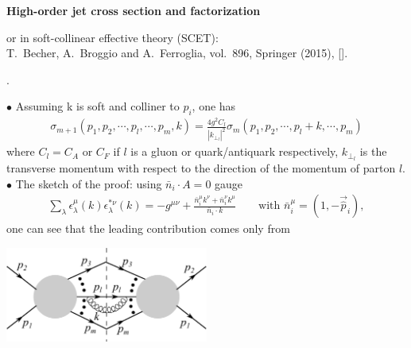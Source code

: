 \documentclass[9pt,a4paper,unknownkeysallowed,xcolor=dvipsnames,aspectratio=43]{beamer}
\begin{document}
\begin{frame}{\bf\huge High-order jet cross section and factorization}
{or in soft-collinear effective theory (SCET):\\\vspace{2mm}
    {\color{teablue}T.~Becher, A.~Broggio and A.~Ferroglia, %
    vol.~896, Springer (2015),
  [\href{https://arxiv.org/abs/1410.1892}{{}}].}

.}
\vspace{2mm}
\end{frame}
%
%
\begin{frame}
\vspace{2mm}

{\color{darkred}\Large$\bullet$} Assuming k is soft and colliner to $p_i$, one has
\begin{align}
    \sigma_{m+1}(p_1, p_2, \cdots, p_l, \cdots, p_m, k)= \frac{4 g^2 C_l}{|k_{\perp_l}|^2} \sigma_{m}(p_1, p_2, \cdots, p_l + k, \cdots, p_m)
\end{align}
where $C_l=C_A$ or $C_F$ if $l$ is a gluon or quark/antiquark respectively, $k_{\perp_l}$ is the transverse momentum with respect to the direction of the momentum of parton $l$.\\\vspace{2mm}
{\color{darkred}\Large$\bullet$} The sketch of the proof:
using $\bar{n}_i\cdot A=0$ gauge
\begin{align}
    \sum\limits_{\lambda} \epsilon_\lambda^\mu(k)\epsilon_\lambda^{*\nu}(k) = -g^{\mu\nu} + \frac{\bar{n}_i^\mu k^\nu + \bar{n}_i^\nu k^\mu}{\bar{n}_i\cdot k}\qquad\text{with $\bar{n}_i^\mu = (1, -\vec{\hat{p}}_i)$},
\end{align}
one can see that the leading contribution comes only from 
\begin{center}
\includegraphics[width=0.5\textwidth]{02/main.pdf}
\end{center}


\end{frame}
\end{document}
